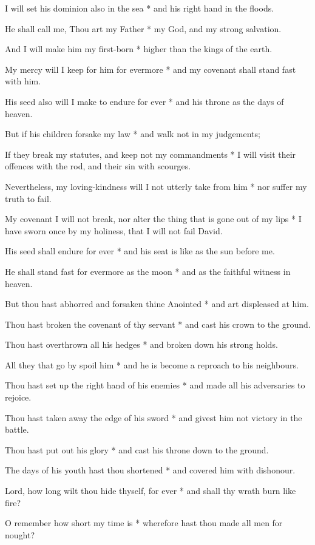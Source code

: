I will set his dominion also in the sea * and his right hand in the floods.

He shall call me, Thou art my Father * my God, and my strong salvation.

And I will make him my first-born * higher than the kings of the earth.

My mercy will I keep for him for evermore * and my covenant shall stand fast with him.

His seed also will I make to endure for ever * and his throne as the days of heaven.

But if his children forsake my law * and walk not in my judgements;

If they break my statutes, and keep not my commandments * I will visit their offences with the rod, and their sin with scourges.

Nevertheless, my loving-kindness will I not utterly take from him * nor suffer my truth to fail.

My covenant I will not break, nor alter the thing that is gone out of my lips * I have sworn once by my holiness, that I will not fail David.

His seed shall endure for ever * and his seat is like as the sun before me.

He shall stand fast for evermore as the moon * and as the faithful witness in heaven.

But thou hast abhorred and forsaken thine Anointed * and art displeased at him.

Thou hast broken the covenant of thy servant * and cast his crown to the ground.

Thou hast overthrown all his hedges * and broken down his strong holds.

All they that go by spoil him * and he is become a reproach to his neighbours.

Thou hast set up the right hand of his enemies * and made all his adversaries to rejoice.

Thou hast taken away the edge of his sword * and givest him not victory in the battle.

Thou hast put out his glory * and cast his throne down to the ground.

The days of his youth hast thou shortened * and covered him with dishonour.

Lord, how long wilt thou hide thyself, for ever * and shall thy wrath burn like fire?

O remember how short my time is * wherefore hast thou made all men for nought?

